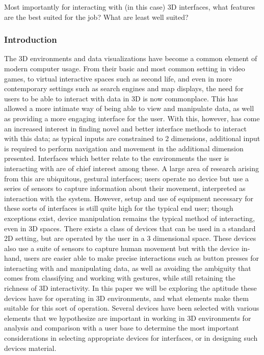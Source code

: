 Most importantly for interacting with (in this case) 3D interfaces, what features are the best suited for the job? What are least well suited?

\subsubsection{Introduction}

The 3D environments and data visualizations have become a common element of modern computer usage. From their basic and most common setting in video games, to virtual interactive spaces such as second life, and even in more contemporary settings such as search engines and map displays, the need for users to be able to interact with data in 3D is now commonplace. This has allowed a more intimate way of being able to view and manipulate data, as well as providing a more engaging interface for the user. With this, however, has come an increased interest in finding novel and better interface methods to interact with this data; as typical inputs are constrained to 2 dimensions, additional input is required to perform navigation and movement in the additional dimension presented. Interfaces which better relate to the environments the user is interacting with are of chief interest among these. A large area of research arising from this are ubiquitous, gestural interfaces; users operate no device but use a series of sensors to capture information about their movement, interpreted as interaction with the system. However, setup and use of equipment necessary for these sorts of interfaces is still quite high for the typical end user; though exceptions exist, device manipulation remains the typical method of interacting, even in 3D spaces. There exists a class of devices that can be used in a standard 2D setting, but are operated by the user in a 3 dimensional space. These devices also use a suite of sensors to capture human movement but with the device in-hand, users are easier able to make precise interactions such as button presses for interacting with and manipulating data, as well as avoiding the ambiguity that comes from classifying and working with gestures, while still retaining the richness of 3D interactivity. In this paper we will be exploring the aptitude these devices have for operating in 3D environments, and what elements make them suitable for this sort of operation. Several devices have been selected with various elements that we hypothesize are important in working in 3D environments for analysis and comparison with a user base to determine the most important considerations in selecting appropriate devices for interfaces, or in designing such devices material.

